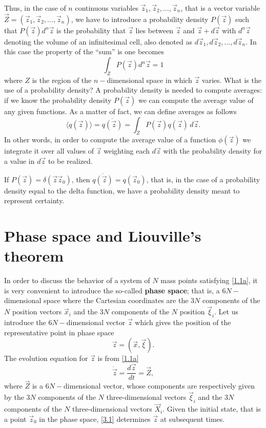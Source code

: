 Thus, in the case of \(n\) continuous variables \(\vec{z}_1, \vec{z}_2, \ldots, \vec{z}_n\), that is a vector variable \(\vec{Z} = (\vec{z}_1, \vec{z}_2, \ldots, \vec{z}_n)\), we have to introduce a probability density \(P(\vec{z})\) such that \(P(\vec{z}) d^n\vec{z}\) is the probability that \(\vec{z}\) lies between \(\vec{z}\) and \(\vec{z} + d\vec{z}\) with \(d^n\vec{z}\) denoting the volume of an infinitesimal cell, also denoted as \(d\vec{z}_1, d\vec{z}_2,\ldots, d\vec{z}_n\). In this case the property of the ``sum'' is one becomes 
\begin{equation}
    \int_Z P(\vec{z}) d^n\vec{z} = 1
    \label{2.1}
\end{equation}
where \(Z\) is the region of the \(n-\)dimensional space in which \(\vec{z}\) varies. 
What is the use of a probability density? A probability density is needed to compute averages: if we know the probability density \(P(\vec{z})\) we can compute the average value of any given functions. As a matter of fact, we can define averages as follows
\begin{equation}
    \langle q(\vec{z}) \rangle = \overline{q(\vec{z})} = \int_Z P(\vec{z}) q(\vec{z}) \, d\vec{z}.
    \label{2.2}
\end{equation}
In other words, in order to compute the average value of a function \(\phi(\vec{z})\) we integrate it over all values of \(\vec{z}\) weighting each \(d\vec{z}\) with the probability density for a value in \(d\vec{z}\) to be realized. 

If \(P(\vec{z}) = \delta(\vec{z} \vec{z}_0)\), then \(\overline{q(\vec{z})} = q(\vec{z}_0)\), that is, in the case of a probability density equal to the delta function, we have a probability density meant to represent certainty.
\section{Phase space and Liouville's theorem}
In order to discuss the behavior of a system of \(N\) mass points satisfying \eqref{1.1a}, it is very convenient to introduce the so-called \textbf{phase space}; that is, a \(6N-\)dimensional space where the Cartesian coordinates are the \(3N\) components of the \(N\) position vectors \(\vec{x}_i\) and the \(3N\) components of the \(N\) position \(\vec{\xi}_i\). Let us introduce the \(6N-\)dimensional vector \(\vec{z}\) which gives the position of the representative point in phase space 
\begin{equation*}
    \vec{z} = (\vec{x}, \vec{\xi}).
\end{equation*} 
The evolution equation for \(\vec{z}\) is from \eqref{1.1a}
\begin{equation}
    \dot{\vec{z}} = \frac{d\vec{z}}{dt} = \vec{Z},
    \label{3.1}
\end{equation} 
where \(\vec{Z}\) is a \(6N-\)dimensional vector, whose components are respectively given by the \(3N\) components of the \(N\) three-dimensional vectors \(\vec{\xi}_i\) and the \(3N\) components of the \(N\) three-dimensional vectors \(\vec{X}_i\). Given the initial state, that is a point \(\vec{z}_0\) in the phase space, \eqref{3.1} determines \(\vec{z}\) at subsequent times. 

